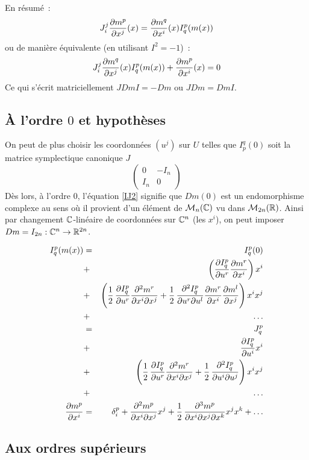 \documentclass[a4paper,draft]{amsart}
\begin{document}
En résumé~:
\begin{equation}
J^j_i \dfrac{\partial{m^p}}{\partial{x^j}}(x) = \dfrac{\partial{m^q}}{\partial{x^i}}(x)I^p_q(m(x))
\end{equation}
ou de manière équivalente (en utilisant $I^2=-1$)~:
\begin{equation}
J^j_i \dfrac{\partial{m^q}}{\partial{x^j}}(x)I^p_q(m(x)) + \dfrac{\partial{m^p}}{\partial{x^i}}(x) = 0 \label{IJ2}
\end{equation}
Ce qui s'écrit matriciellement $J Dm I = -Dm$ ou $J Dm = Dm I$.

\subsection{À l'ordre $0$ et hypothèses}
On peut de plus choisir les coordonnées $(u^j)$ sur $U$ telles que $I_p^q(0)$ soit la matrice symplectique canonique $J$
\[
\begin{pmatrix}
0 & -I_n \\ 
I_n & 0
\end{pmatrix}
\]
Dès lors, à l'ordre $0$, l'équation \eqref{IJ2} signifie que $Dm(0)$ est un endomorphisme complexe au sens où il provient d'un élément de $\mathcal{M}_n(\mathbb{C})$ vu dans $\mathcal{M}_{2n}(\mathbb{R})$. Ainsi par changement $\mathbb{C}$-linéaire de coordonnées sur $\mathbb{C}^n$ (les $x^i$), on peut imposer $Dm = I_{2n} : \mathbb{C}^n \rightarrow \mathbb{R}^{2n}$.

\begin{eqnarray*}
I^p_q(m(x)) & = & I^p_q(0) \\
			& + & \left(\dfrac{\partial{I^p_q}}{\partial{u^r}}\dfrac{\partial{m^r}}{\partial{x^i}}\right)x^i \\
			& + & \left(\operatorname{\frac{1}{2}} \dfrac{\partial{I^p_q}}{\partial{u^r}}\dfrac{\partial^2{m^r}}{\partial{x^i}\partial{x^j}}
					+ \operatorname{\frac{1}{2}} \dfrac{\partial^2{I^p_q}}{\partial{u^r}\partial{u^l}}\dfrac{\partial{m^r}}{\partial{x^i}}\dfrac{\partial{m^l}}{\partial{x^j}}\right)x^ix^j \\
			& + & \dots\\
			& = & J^p_q \\
			& + & \dfrac{\partial{I^p_q}}{\partial{u^i}}x^i \\
			& + & \left(\operatorname{\frac{1}{2}} \dfrac{\partial{I^p_q}}{\partial{u^r}}\dfrac{\partial^2{m^r}}{\partial{x^i}\partial{x^j}}
					+ \operatorname{\frac{1}{2}} \dfrac{\partial^2{I^p_q}}{\partial{u^i}\partial{u^j}}\right)x^ix^j \\
			& + & \dots\\
\dfrac{\partial{m^p}}{\partial{x^i}} 
			& = & \delta^p_i + \dfrac{\partial^2{m^p}}{\partial{x^i}\partial{x^j}}x^j + \operatorname{\frac{1}{2}} \dfrac{\partial^3{m^p}}{\partial{x^i}\partial{x^j}\partial{x^k}}x^jx^k + \dots
\end{eqnarray*}

\subsection{Aux ordres supérieurs}
\end{document}

